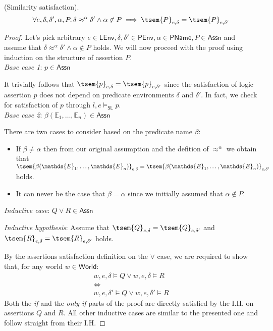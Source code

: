 \begin{lem}
	\label{lem:simSat}
	(Similarity satisfaction).
	\[
		\forall e, \delta, \delta', \alpha, P \ldotp \delta \approx^\alpha \delta' \land \alpha \not\in P \implies \tsem{P}_{e, \delta} = \tsem{P}_{e, \delta'}
	\]
	{\parindent0pt
	\begin{proof}
		Let's pick arbitrary $e \in \mathsf{LEnv}, \delta, \delta' \in \mathsf{PEnv}, \alpha \in \mathsf{PName}, P \in \mathsf{Assn}$ and assume that $\delta \approx^\alpha \delta' \land \alpha \not\in P$ holds. We will now proceed with the proof using induction on the structure of assertion $P$. \\
		\indline
		\textit{Base case 1}: $p \in \mathsf{Assn}$
		
		It trivially follows that $\tsem{p}_{e, \delta} = \tsem{p}_{e, \delta'}$ since the satisfaction of logic assertion $p$ does not depend on predicate environments $\delta$ and $\delta'$. In fact, we check for satisfaction of $p$ through $l, e \vDash_\mathsf{SL} p$. \\
		\indline
		\textit{Base case 2}: $\beta(\mathds{E}_1, \ldots, \mathds{E}_n) \in \mathsf{Assn}$
		
		There are two cases to consider based on the predicate name $\beta$:
		\begin{itemize}
			\item If $\beta \neq \alpha$ then from our original assumption and the defition of $\approx^\alpha$ we obtain that $\tsem{\beta(\mathds{E}_1, \ldots, \mathds{E}_n)}_{e, \delta} = \tsem{\beta(\mathds{E}_1, \ldots, \mathds{E}_n)}_{e, \delta'}$ holds.
			
			\item It can never be the case that $\beta = \alpha$ since we initially assumed that $\alpha \not\in P$.
		\end{itemize}
		\indline
		\textit{Inductive case}: $Q \lor R \in \mathsf{Assn}$
		
		\textit{Inductive hypothesis}: Assume that $\tsem{Q}_{e, \delta} = \tsem{Q}_{e, \delta'}$ and $\tsem{R}_{e, \delta} = \tsem{R}_{e, \delta'}$ holds.
		
		By the assertions satisfaction definition on the $\lor$ case, we are required to show that, for any world $w \in \mathsf{World}$:
		\begin{gather}
			w, e, \delta \vDash Q \lor w, e, \delta \vDash R \\
			\iff \\
			w, e, \delta' \vDash Q \lor w, e, \delta' \vDash R
		\end{gather}
		Both the \textit{if} and the \textit{only if} parts of the proof are directly satisfied by the I.H. on assertions $Q$ and $R$. All other inductive cases are similar to the presented one and follow straight from their I.H.
	\end{proof}
	}
\end{lem}

